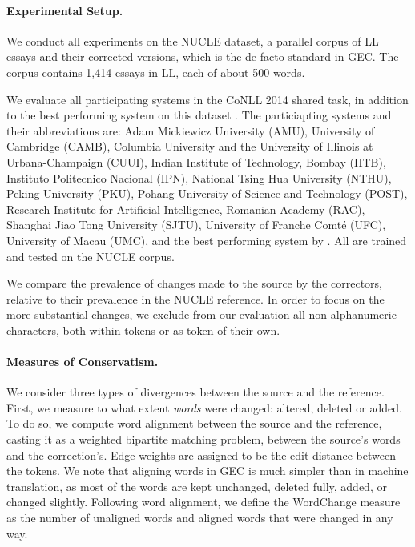 \documentclass[letter,11pt]{article}
\newcommand{\oa}[1]{\footnote{\color{red}OA: #1}}
\begin{document}
\paragraph{Experimental Setup.}\label{par:experimental_setup}
We conduct all experiments on the NUCLE dataset,
a parallel corpus of LL essays and their corrected versions,
which is the de facto standard in GEC.
The corpus contains 1,414 essays in LL, each of about 500 words.

We evaluate all participating systems in the CoNLL 2014 shared task,
in addition to the best performing system on this dataset \cite{rozovskaya2014building}.
The particiapting systems and their abbreviations are: Adam Mickiewicz University (AMU),
University of Cambridge (CAMB), Columbia University and the University of Illinois at Urbana-Champaign (CUUI),
Indian Institute of Technology, Bombay (IITB), Instituto Politecnico Nacional (IPN),
National Tsing Hua University (NTHU), Peking University (PKU), Pohang University of Science and Technology (POST),
Research Institute for Artificial Intelligence, Romanian Academy (RAC), Shanghai Jiao Tong University (SJTU),
University of Franche Comt\'{e} (UFC), University of Macau (UMC),
and the best performing system by .
All are trained and tested on the NUCLE corpus.

We compare the prevalence of changes made to the source by the correctors,
relative to their prevalence in the NUCLE reference.
In order to focus on the more substantial changes, we exclude from our evaluation
all non-alphanumeric characters, both within tokens or as token of their own.
%

\paragraph{Measures of Conservatism.}
We consider three types of divergences between the source and the reference.
First, we measure to what extent \emph{words} were changed: altered, deleted or added.
To do so, we compute word alignment between the source and the reference, casting it
as a weighted bipartite matching problem, between the source's words and the correction's. 
Edge weights are assigned to be the edit distance
between the tokens.
We note that aligning words in GEC is much simpler than in machine translation,
as most of the words are kept unchanged, deleted fully, added, or changed slightly.
Following word alignment, we define the {\sc WordChange} measure
as the number of unaligned words and aligned words that were changed in any way.
\end{document}
